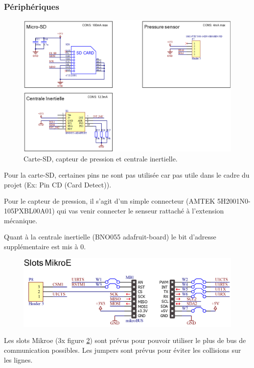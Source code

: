 {	\clearpage
	\subsubsection{Périphériques}
	{
		\begin{figure}[h]
			\centering
			\includegraphics[width=0.85\linewidth]{Figures/Dev-SCH/Periph1}
			\caption{Carte-SD, capteur de pression et centrale inertielle.}
			\label{fig:periph1}
		\end{figure}
		
		Pour la carte-SD, certaines pins ne sont pas utilisée car pas utile dans le cadre du projet (Ex: Pin CD (Card Detect)).
		
		Pour le capteur de pression, il s'agit d'un simple connecteur (AMTEK 5H2001N0-105PXBL00A01) qui vas venir connecter le senseur rattaché à l'extension mécanique.
		
		Quant à la centrale inertielle (BNO055 adafruit-board) le bit d'adresse supplémentaire est mis à 0.
		
		\begin{figure}[h]
			\centering
			\includegraphics[width=0.8\linewidth]{Figures/Dev-SCH/Mikroe}
			\caption{}
			\label{fig:mikroe}
		\end{figure}
		Les slots Mikroe (3x figure \ref{fig:mikroe}) sont prévus pour pouvoir utiliser le plus de bus de communication possibles. Les jumpers sont prévus pour éviter les collisions sur les lignes.
		
	}

}
